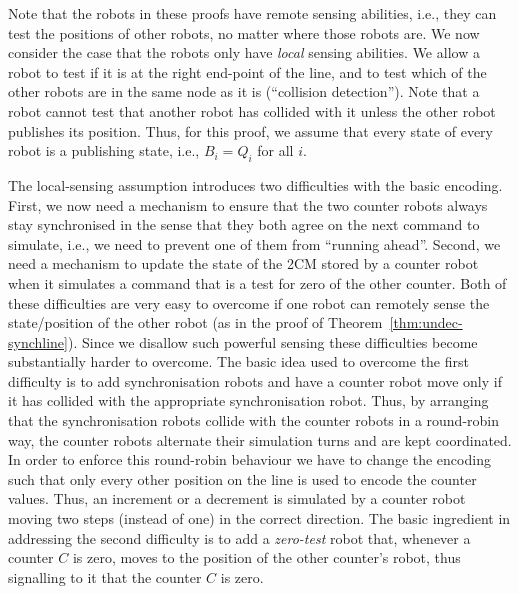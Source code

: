 Note that the robots in these proofs have remote sensing abilities, i.e., they can test the positions %
of other robots, no matter where those robots are.
We now consider the case that the robots only have \emph{local} sensing abilities. We allow a robot to test
if it is at the right end-point of the line, and to test which of the other robots are in the same node as it is (``collision detection''). 
Note that a robot cannot test that another robot has collided with it unless the other robot publishes its position. Thus, for this proof, we assume that every state of every robot is a publishing state, i.e., $B_i = Q_i$ for all $i$.

The local-sensing assumption introduces two difficulties with the basic encoding. First, we now need a mechanism to ensure that the two counter robots always stay synchronised in the sense that they both agree on the next command to simulate, i.e., we need to prevent one of them from ``running ahead''.
Second, we need a mechanism to update the state of the 2CM stored by a counter robot when it simulates a command that is a test for zero of the other counter.
Both of these difficulties are very easy to overcome if one robot can remotely sense the state/position of the other robot (as in the proof of
Theorem~\ref{thm:undec-synchline}).
Since we disallow such powerful sensing these difficulties become substantially harder to overcome. The basic idea used to overcome the first difficulty is to add synchronisation robots and have a counter robot move only if it has collided with the appropriate synchronisation robot. Thus, by arranging that the synchronisation robots collide with the counter robots in a round-robin way, the counter robots alternate their simulation turns and are kept coordinated. In order to enforce this round-robin behaviour we have to change the encoding such that only every other position on the line is used to encode the counter values. Thus, an increment or a decrement is simulated by a counter robot moving two steps (instead of one) in the correct direction. The basic ingredient in addressing the second difficulty is to add a {\em zero-test} robot that, whenever a counter $C$ is zero, moves to the position of the other counter's robot, thus signalling to it that the counter $C$ is zero.

